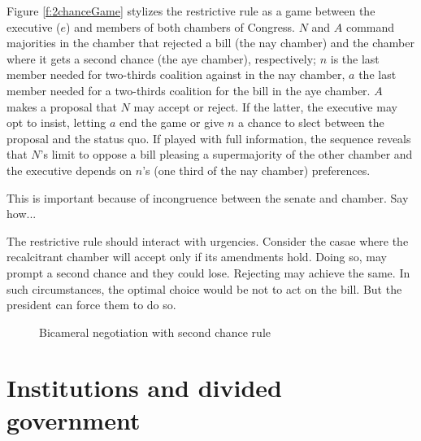 \documentclass[letter,12pt]{article}
\begin{document}
Figure \ref{f:2chanceGame} stylizes the restrictive rule as a game between the executive ($e$) and members of both chambers of Congress. $N$ and $A$ command majorities in the chamber that rejected a bill (the nay chamber) and the chamber where it gets a second chance (the aye chamber), respectively; $n$ is the last member needed for two-thirds coalition against in the nay chamber, $a$ the last member needed for a two-thirds coalition for the bill in the aye chamber. $A$ makes a proposal that $N$ may accept or reject. If the latter, the executive may opt to insist, letting $a$ end the game or give $n$ a chance to slect between the proposal and the status quo. If played with full information, the sequence reveals that $N$'s limit to oppose a bill pleasing a supermajority of the other chamber and the executive depends on $n$'s (one third of the nay chamber) preferences. 

This is important because of incongruence between the senate and chamber. Say how...

The restrictive rule should interact with urgencies. Consider the casae where the recalcitrant chamber will accept only if its amendments hold. Doing so, may prompt a second chance and they could lose. Rejecting may achieve the same. In such circumstances, the optimal choice would be not to act on the bill. But the president can force them to do so. 

\begin{figure}
  \begin{center}
  \caption{Bicameral negotiation with second chance rule}\label{f:2chanceEql}
  \end{center}
\end{figure}





\section{Institutions and divided government}
\end{document}
